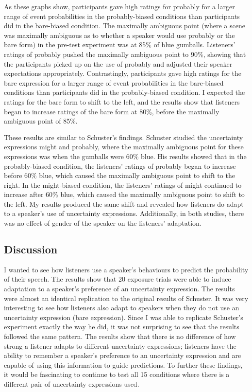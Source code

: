 \documentclass{sp}          %
\begin{document}
As these graphs show, participants gave high ratings for probably for a larger range of event probabilities in the probably-biased conditions than participants did in the bare-biased condition. The maximally ambiguous point (where a scene was maximally ambiguous as to whether a speaker would use probably or the bare form) in the pre-test experiment was at 85\% of blue gumballs. Listeners’ ratings of probably pushed the maximally ambiguous point to 90\%, showing that the participants picked up on the use of probably and adjusted their speaker expectations appropriately. Contrastingly, participants gave high ratings for the bare expression for a larger range of event probabilities in the bare-biased conditions than participants did in the probably-biased condition. I expected the ratings for the bare form to shift to the left, and the results show that listeners began to increase ratings of the bare form at 80\%, before the maximally ambiguous point of 85\%. 

These results are similar to Schuster’s findings. Schuster studied the uncertainty expressions might and probably, where the maximally ambiguous point for these expressions was when the gumballs were 60\% blue. His results showed that in the probably-biased condition, the listeners’ ratings of probably began to increase before 60\% blue, which caused the maximally ambiguous point to shift to the right. In the might-biased condition, the listeners’ ratings of might continued to increase after 60\% blue, which caused the maximally ambiguous point to shift to the left. My results produced the same shift and revealed how listeners do adapt to a speaker’s use of uncertainty expressions. Additionally, in both studies, there was no effect of gender of the speaker on the listeners’ adaptation. 

\subsection{Discussion}
I wanted to see how listeners use a speaker’s behaviours to predict the probability of their speech. The results show that 20 exposure trials were able to induce adaptation to a speaker’s preference of an uncertainty expression. The results were almost an identical replication to the original results of Schuster. It was very interesting to see how listeners also adapt to speakers when they do not use an uncertainty expression (bare expression). Since I was able to replicate Schuster’s experiment exactly the way he did, it was not surprising to see that the results followed the same pattern. The results show that there is no difference of how strong a listener adapts to different uncertainty expressions; listeners have the ability to remember a speaker’s preference to an uncertainty expression and are capable of using this information to guide predictions. To further these findings, it would be fascinating to continue to test all 15 conditions where there is a different pair of uncertainty expressions used. 
\end{document}
